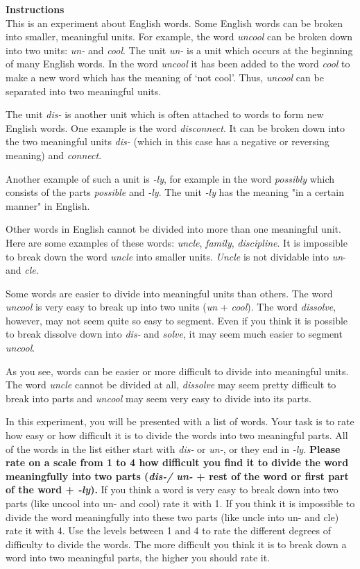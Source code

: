 \noindent  \textbf{Instructions}\\ 

\noindent  This is an experiment about English words. Some English words can be broken into smaller, meaningful units.
For example, the word \textit{uncool} can be broken down into two units: \textit{un-} and \textit{cool}. The unit \textit{{un-} }is a unit which occurs at the beginning of many English words. In the word \textit{uncool} it has been added to the word \textit{cool} to make a new word which has the meaning of ‘not cool’. Thus, \textit{uncool} can be separated into two meaningful units.

The unit \textit{dis-} is another unit which is often attached to words to form new English words. One example is the word \textit{disconnect}. It can be broken down into the two meaningful units \textit{{dis-} }(which in this case has a negative or reversing meaning) and \textit{connect}.

Another example of such a unit is \textit{-ly}, for example in the word \textit{possibly} which consists of the parts \textit{possible} and \textit{-ly}.  The unit\textit{ {-ly} }has the meaning "in a certain manner" in English.

Other words in English cannot be divided into more than one meaningful unit. Here are some examples of these words: \textit{uncle}, \textit{family}, \textit{discipline}. It is impossible to break down the word \textit{uncle} into smaller units. \textit{Uncle} is not dividable into \textit{un}- and \textit{cle}.

Some words are easier to divide into meaningful units than others. The word \textit{uncool} is very easy to break up into two units (\textit{un} + \textit{cool}). The word \textit{dissolve}, however, may not seem quite so easy to segment. Even if you think it is possible to break dissolve down into \textit{dis-} and \textit{solve}, it may seem much easier to segment \textit{uncool}.

As you see, words can be easier or more difficult to divide into meaningful units. The word \textit{uncle} cannot be divided at all, \textit{dissolve} may seem pretty difficult to break into parts and \textit{uncool} may seem very easy to divide into its parts. 

In this experiment, you will be presented with a list of words. Your task is to rate how easy or how difficult it is to divide the words into two meaningful parts. All of the words in the list either start with \textit{dis-} or \textit{un-}, or they end in \textit{{-ly}.} \textbf{Please rate on a scale from 1 to 4 how difficult you find it to divide the word meaningfully into two parts (\textit{{dis-}/ un-} + rest of the word or first part of the word + \textit{-ly}). }If you think a word is very easy to break down into two parts (like uncool into {un-} and cool) rate it with 1.  If you think it is impossible to divide the word meaningfully into these two parts (like uncle into {un-} and cle) rate it with 4. Use the levels between 1 and 4 to rate the different degrees of difficulty to divide the words. The more difficult you think it is to break down a word into two meaningful parts, the higher you should rate it.


